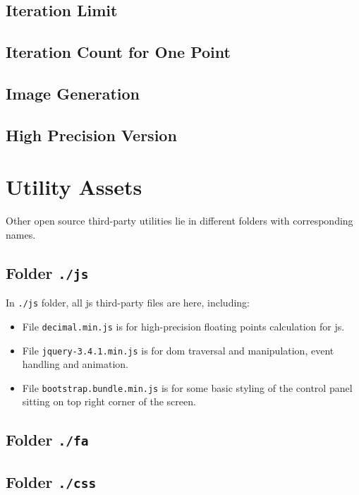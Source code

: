 \subsection{Iteration Limit}

\subsection{Iteration Count for One Point}

\subsection{Image Generation}

\subsection{High Precision Version}

\section{Utility Assets}

Other open source third-party utilities lie in different folders with corresponding names.

\subsection{Folder \texttt{./js}}

In \texttt{./js} folder, all \gls{js} third-party files are here, including:

\begin{itemize}
    \item File \texttt{decimal.min.js} is for high-precision floating points calculation for \glsdesc{js}.
    \item File \texttt{jquery-3.4.1.min.js} is for \gls{dom} traversal and manipulation, event handling and animation.
    \item File \texttt{bootstrap.bundle.min.js} is for some basic styling of the control panel sitting on top right corner of the screen.
\end{itemize}

\subsection{Folder \texttt{./fa}}

\subsection{Folder \texttt{./css}}